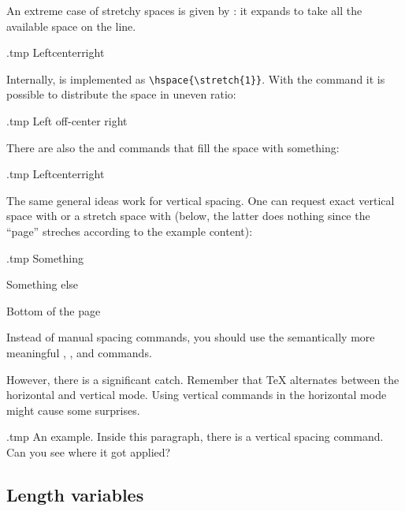 An extreme case of stretchy spaces is given by :
it expands to take all the available space on the line.
%
\begin{VerbatimOut}{\jobname.tmp}
Left\hfill center\hfill right
\end{VerbatimOut}
\ShowExampleBelow
%
Internally,  is implemented as \verb|\hspace{\stretch{1}}|.
With the  command it is possible to distribute the space in uneven ratio:
%
\begin{VerbatimOut}{\jobname.tmp}
Left off-center right
\end{VerbatimOut}
\ShowExampleBelow

There are also the  and  commands
that fill the space with something:
%
\begin{VerbatimOut}{\jobname.tmp}
Left\hrulefill center\dotfill right
\end{VerbatimOut}
\ShowExampleBelow

The same general ideas work for vertical spacing.
One can request exact vertical space with  or a stretch space with 
(below, the latter does nothing since the ``page'' streches according to the example content):
%
\begin{VerbatimOut}{\jobname.tmp}
Something

\vspace{1cm}

Something else

\vfill

Bottom of the page
\end{VerbatimOut}
\ShowExample

Instead of manual spacing commands,
you should use the semantically more meaningful
, , and  commands.

However, there is a significant catch.
Remember that \TeX{} alternates between the horizontal and vertical mode.
Using vertical commands in the horizontal mode might cause some surprises.
%
\begin{VerbatimOut}{\jobname.tmp}
An example.
\bigskip
Inside this paragraph,
there is a vertical spacing command.
Can you see where it got applied?
\end{VerbatimOut}
\ShowExample


%
%
\subsection{Length variables}

